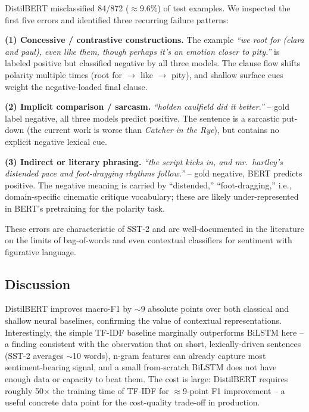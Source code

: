 \documentclass[11pt,a4paper]{article}
\begin{document}
DistilBERT misclassified 84/872 ($\approx$9.6\%) of test examples. We inspected the first five errors and identified three recurring failure patterns:

\textbf{(1) Concessive / contrastive constructions.} The example
\textit{``we root for (clara and paul), even like them, though perhaps it's an emotion closer to pity.''}
is labeled positive but classified negative by all three models. The clause flow shifts polarity multiple times (root for $\to$ like $\to$ pity), and shallow surface cues weight the negative-loaded final clause.

\textbf{(2) Implicit comparison / sarcasm.} \textit{``holden caulfield did it better.''} -- gold label negative, all three models predict positive. The sentence is a sarcastic put-down (the current work is worse than \textit{Catcher in the Rye}), but contains no explicit negative lexical cue.

\textbf{(3) Indirect or literary phrasing.} \textit{``the script kicks in, and mr.\ hartley's distended pace and foot-dragging rhythms follow.''} -- gold negative, BERT predicts positive. The negative meaning is carried by ``distended,'' ``foot-dragging,'' i.e., domain-specific cinematic critique vocabulary; these are likely under-represented in BERT's pretraining for the polarity task.

These errors are characteristic of SST-2 and are well-documented in the literature on the limits of bag-of-words and even contextual classifiers for sentiment with figurative language.

\subsection{Discussion}

DistilBERT improves macro-F1 by $\sim$9 absolute points over both classical and shallow neural baselines, confirming the value of contextual representations. Interestingly, the simple TF-IDF baseline marginally outperforms BiLSTM here -- a finding consistent with the observation that on short, lexically-driven sentences (SST-2 averages $\sim$10 words), n-gram features can already capture most sentiment-bearing signal, and a small from-scratch BiLSTM does not have enough data or capacity to beat them. The cost is large: DistilBERT requires roughly 50$\times$ the training time of TF-IDF for $\approx$9-point F1 improvement -- a useful concrete data point for the cost-quality trade-off in production.

\end{document}
